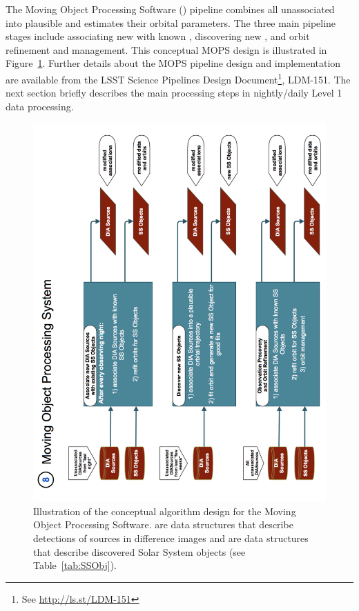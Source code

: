 The Moving Object Processing Software () pipeline combines all unassociated \DIASources into
plausible \SSObjects and estimates their orbital parameters. The three main pipeline stages
include associating new \DIASources with known \SSObjects, discovering new \SSObjects,
and orbit refinement and management. This conceptual MOPS design is illustrated in
Figure~\ref{fig:Pipe8}. Further details about the MOPS pipeline design and implementation are available
from the LSST Science Pipelines Design Document\footnote{See \url{http://ls.st/LDM-151}}, LDM-151.
The next section briefly describes the main processing steps in nightly/daily Level 1 data processing.

\begin{figure}[!t]
    \centering
    \includegraphics[scale=0.60, angle=270]{MOPS-Level0}
    \vskip -0.1in
    \caption{Illustration of the conceptual algorithm design for the Moving Object Processing Software.
   \DIASources are data structures that describe detections of sources in difference images and
   \SSObjects are data structures that describe discovered Solar System objects (see Table~\ref{tab:SSObj}).
\label{fig:Pipe8}}
\end{figure}


